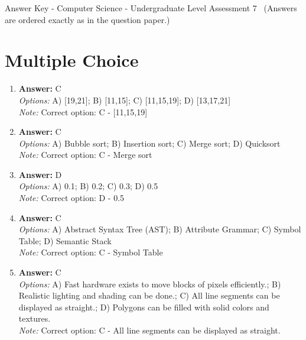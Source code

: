 \documentclass[12pt]{article}
\begin{document}
\begin{center}
Answer Key - Computer Science - Undergraduate Level Assessment 7 \
\small (Answers are ordered exactly as in the question paper.)
\end{center}

\section*{Multiple Choice}
\begin{enumerate}[label=\arabic*.]
\item \textbf{Answer:} C
\\ \textit{Options:} A) [19,21]; B) [11,15]; C) [11,15,19]; D) [13,17,21]
\\ \textit{Note:} Correct option: C - [11,15,19]
\item \textbf{Answer:} C
\\ \textit{Options:} A) Bubble sort; B) Insertion sort; C) Merge sort; D) Quicksort
\\ \textit{Note:} Correct option: C - Merge sort
\item \textbf{Answer:} D
\\ \textit{Options:} A) 0.1; B) 0.2; C) 0.3; D) 0.5
\\ \textit{Note:} Correct option: D - 0.5
\item \textbf{Answer:} C
\\ \textit{Options:} A) Abstract Syntax Tree (AST); B) Attribute Grammar; C) Symbol Table; D) Semantic Stack
\\ \textit{Note:} Correct option: C - Symbol Table
\item \textbf{Answer:} C
\\ \textit{Options:} A) Fast hardware exists to move blocks of pixels efficiently.; B) Realistic lighting and shading can be done.; C) All line segments can be displayed as straight.; D) Polygons can be filled with solid colors and textures.
\\ \textit{Note:} Correct option: C - All line segments can be displayed as straight.
\end{enumerate}
\end{document}

